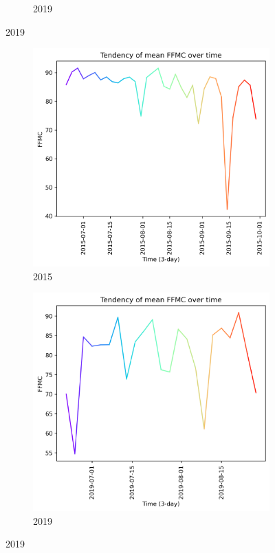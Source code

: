 \begin{figure}[h]
\begin{subfigure}{0.49\textwidth}
		\caption{2019}
		\label{fig:mean_tendency_fwi_2019}
	\end{subfigure}
	\label{fig:mean_tendency_fwi}
\end{figure}

\begin{figure}[h]
	\caption{FFMC mean tendency graph}
	\centering
	\begin{subfigure}{0.49\textwidth}
		\centering
		\includegraphics[width=\textwidth]{graphs/2015/tendency/2015_tendency_graph_FFMC.png}
		\caption{2015}
		\label{fig:mean_tendency_ffmc_2015}
	\end{subfigure}
	\hfill
	\begin{subfigure}{0.49\textwidth}
		\centering
		\includegraphics[width=\textwidth]{graphs/2019/tendency/2019_tendency_graph_FFMC.png}
		\caption{2019}
		\label{fig:mean_tendency_ffmc_2019}
	\end{subfigure}
	\label{fig:mean_tendency_ffmc}
\end{figure}

